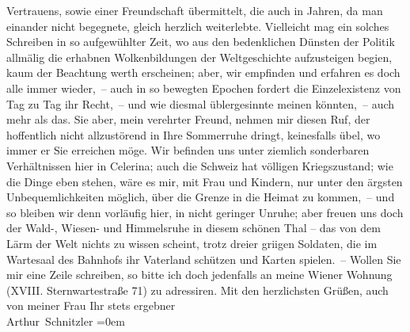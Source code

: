\begin{ledgroupsized}[t]{13cm}
                    Vertrauens, sowie einer Freundschaft übermittelt, die auch in  Jahren, da man einander nicht begegnete,
                    gleich herzlich weiterlebte.\pend
           \pstart
           Vielleicht mag ein solches Schreiben in so aufgewühlter Zeit, wo aus den
                    bedenklichen Dünsten der Politik allmälig die erhabnen Wolkenbildun{\pb}gen der Weltgeschichte aufzusteigen begi{\geminationn}en, kaum der Beachtung werth erscheinen; aber,
                    wir empfinden und erfahren es doch alle immer wieder, – auch in so bewegten
                    Epochen fordert die Einzelexistenz von Tag zu Tag ihr Recht, – und wie diesmal
                    üblergesinnte meinen könnten, – auch mehr als das. Sie aber, mein verehrter
                    Freund, nehmen mir diesen Ruf, der hoffentlich nicht allzustörend in Ihre
                    Sommerruhe dringt, keinesfalls übel, wo immer er Sie erreichen möge.\pend
           \pstart
           Wir befinden uns unter ziemlich sonderbaren Verhältnissen hier in Celerina; auch die Schweiz hat völligen Kriegszustand; wie die Dinge eben
                    stehen, wäre es mir, mit Frau und Kindern, nur unter den ärgsten {\pb}Unbequemlichkeiten möglich, über die Grenze in die Heimat zu kommen, – und so
                    bleiben wir denn vorläufig \introOben{}hier\introOben{}, in nicht geringer
                    Unruhe; aber freuen uns doch der Wald-, Wiesen- und Himmelsruhe in diesem
                    schönen Thal – das von dem Lärm der Welt nichts zu wissen scheint, trotz dreier
                        gri{\geminationm}igen Soldaten, die im Wartesaal des
                    Bahnhofs ihr Vaterland schützen und Karten spielen. –\pend
           \pstart
           Wollen Sie mir eine Zeile schreiben, so bitte ich doch jedenfalls an meine Wiener Wohnung (XVIII. Sternwartestraße 71) zu adressiren.\pend
           \pstart
           Mit den herzlichsten Grüßen, auch von meiner Frau\pend
           \pstart
           Ihr stets ergebner{\\[\baselineskip]}\spacefill\mbox{Arthur Schnitzler}\pend
           \leftskip=0em{}          \endnumbering{}\end{ledgroupsized}  \newcommand{\dateiname}{L02190}\newcommand{\titel}{Arthur Schnitzler an Georg Brandes, 3. 8. 1914}\newcommand{\editorInnen}{Martin Anton Müller und Gerd-Hermann Susen}
      